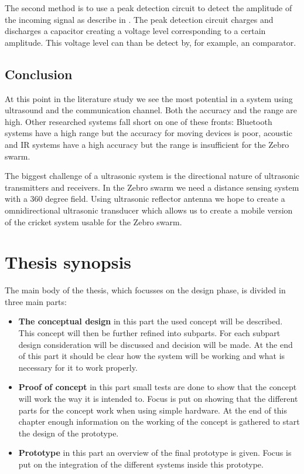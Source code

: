 The second method is to use a peak detection circuit to detect the amplitude of the incoming signal as describe in \cite{Bhagat2015}.
The peak detection circuit charges and discharges a capacitor creating a voltage level corresponding to a certain amplitude.
This voltage level can than be detect by, for example, an comparator.

\subsection*{Conclusion}

At this point in the literature study we see the most potential in a system using ultrasound and the communication channel. Both the accuracy and the range are high. Other researched systems fall short on one of these fronts: Bluetooth systems have a high range but the accuracy for moving devices is poor, acoustic and IR systems have a high accuracy but the range is insufficient for the Zebro swarm.

The biggest challenge of a ultrasonic system is the directional nature of ultrasonic transmitters and receivers. In the Zebro swarm we need a distance sensing system with a 360 degree field. Using ultrasonic reflector antenna \cite{Claycomb1992} we hope to create a omnidirectional ultrasonic transducer which allows us to create a mobile version of the cricket system \cite{Priyantha2000,Priyantha2005,Balakrishnan2003,Smith2005} usable for the Zebro swarm.


\section{Thesis synopsis}

The main body of the thesis, which focusses on the design phase, is divided in three main parts:

\begin{itemize}
  \item
  \textbf{The conceptual design} in this part the used concept will be described.
  This concept will then be further refined into subparts.
  For each subpart design consideration will be discussed and decision will be made.
  At the end of this part it should be clear how the system will be working and what is necessary for it to work properly.
  \item
  \textbf{Proof of concept} in this part small tests are done to show that the concept will work the way it is intended to.
  Focus is put on showing that the different parts for the concept work when using simple hardware.
  At the end of this chapter enough information on the working of the concept is gathered to start the design of the prototype.
  \item
  \textbf{Prototype} in this part an overview of the final prototype is given.
  Focus is put on the integration of the different systems inside this prototype.
  \end{itemize}

